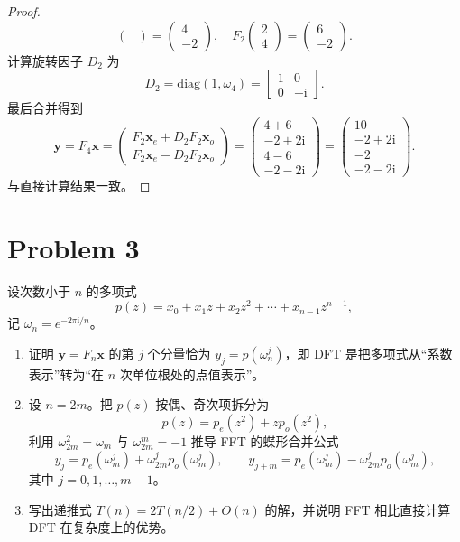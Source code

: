\begin{proof}
\[\begin{pmatrix}
        \end{pmatrix} = \begin{pmatrix}
            4 \\
            -2
        \end{pmatrix}, \quad F_2 \begin{pmatrix}
            2 \\
            4
        \end{pmatrix} = \begin{pmatrix}
            6 \\
            -2
        \end{pmatrix}.
    \]
    计算旋转因子 $D_2$ 为
    \[
        D_2 = \mathrm{diag}\left(1, \omega_4\right) = \begin{bmatrix}
            1 & 0 \\
            0 & -\mathrm{i}
        \end{bmatrix}.
    \]
    最后合并得到
    \[
        \bm{y} = F_4 \bm{x} = \begin{pmatrix}
            F_2 \bm{x}_e + D_2 F_2 \bm{x}_o \\
            F_2 \bm{x}_e - D_2 F_2 \bm{x}_o
        \end{pmatrix} = \begin{pmatrix}
            4 + 6 \\
            -2 + 2\mathrm{i} \\
            4 - 6 \\
            -2 - 2\mathrm{i}
        \end{pmatrix} = \begin{pmatrix}
            10 \\
            -2 + 2\mathrm{i} \\
            -2 \\
            -2 - 2\mathrm{i}
        \end{pmatrix}.
    \]
    与直接计算结果一致。
\end{proof}

\section*{Problem 3}

设次数小于 $n$ 的多项式
\[
    p(z) = x_0 + x_1 z + x_2 z^2 + \cdots + x_{n - 1} z^{n - 1},
\]
记 $\omega_n = e^{-2\pi \mathrm{i}/n}$。

\begin{enumerate}
    \item 证明 $\bm{y} = F_n \bm{x}$ 的第 $j$ 个分量恰为 $y_j = p(\omega_n^j)$，即 DFT 是把多项式从“系数表示”转为“在 $n$ 次单位根处的点值表示”。
    \item 设 $n = 2m$。把 $p(z)$ 按偶、奇次项拆分为
    \[
        p(z) = p_e(z^2) + z p_o(z^2),
    \]
    利用 $\omega_{2m}^2 = \omega_m$ 与 $\omega_{2m}^m = -1$ 推导 FFT 的蝶形合并公式
    \[
        y_j = p_e(\omega_m^j) + \omega_{2m}^j p_o(\omega_m^j), \qquad
        y_{j + m} = p_e(\omega_m^j) - \omega_{2m}^j p_o(\omega_m^j),
    \]
    其中 $j = 0, 1, \ldots, m - 1$。
    \item 写出递推式 $T(n) = 2T(n/2) + O(n)$ 的解，并说明 FFT 相比直接计算 DFT 在复杂度上的优势。
\end{enumerate}

